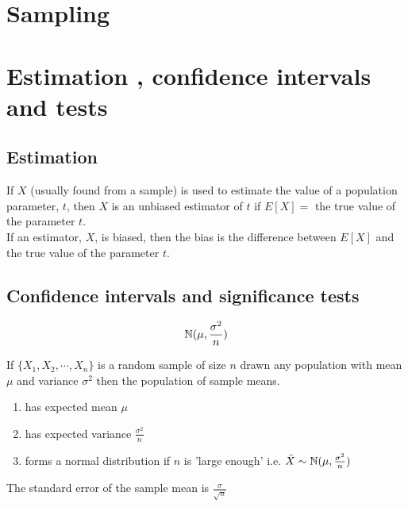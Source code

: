 \documentclass[a4paper]{article}
\begin{document}
\section{Sampling}

\section{Estimation , confidence intervals and tests}
\subsection{Estimation}
\begin{defi}
	If $X$  (usually found from a sample) is used to estimate the value of a population parameter,
	$t$, then $X$ is an unbiased estimator of $t$ if $E[X] =$ the true value of the parameter $t$. \\

	If an estimator, $X$, is biased, then the bias is the difference between $E[X]$ and the true value of the parameter $t$.
\end{defi}

\begin{defi}

\end{defi}


\subsection{Confidence intervals and significance tests}
\begin{defi}
	\[
		\mathbb{N}(\mu,\frac{\sigma^2}{n})
	\]
\end{defi}

\begin{thm}
	If $\{X_1,X_2,\cdots,X_n\}$ is a random sample of size $n$ drawn any population with mean $\mu$ and variance $\sigma^2$ then the population of sample means.
	\begin{enumerate}
	\item has expected mean $\mu$
	\item has expected variance $\frac{\sigma^2}{n}$
	\item forms a normal distribution if $n$ is 'large enough' i.e. $\bar{X}\sim \mathbb{N}(\mu,\frac{\sigma^2}{n})$
	\end{enumerate}
	The standard error of the sample mean is $\frac{\sigma}{\sqrt{n}}$
\end{thm}
\end{document}
